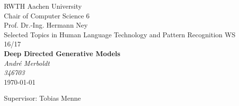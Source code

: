 \documentclass[twoside,11pt,a4paper]{article}
\theoremstyle{break}
\begin{document}
\pagestyle{empty}

\begin{center}

    RWTH Aachen University\\
    Chair of Computer Science 6 \\
    Prof. Dr.-Ing. Hermann Ney\\[6ex]
    Selected Topics in Human Language Technology and Pattern Recognition WS 16/17\\[12ex]

    \LARGE
    \textbf{Deep Directed Generative Models} \\[6ex]
    \textit{André Merboldt} \\[6ex]
    \textit{346703} \\[6ex]
    \today

    \vfill
    \Large Supervisor: Tobias Menne
\end{center}

\newpage
\
\newpage


\pagestyle{headings}
\tableofcontents
\listoftables
\listoffigures
\newpage
\pagestyle{headings}









%














%

\newpage



\newpage



\end{document}
